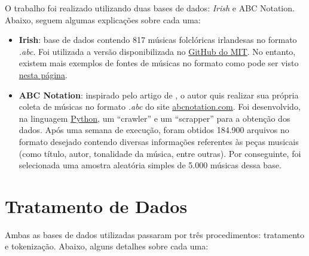 \documentclass{automatextcc}
\begin{document}


O trabalho foi realizado utilizando duas bases de dados: \textit{Irish} e {ABC Notation}. Abaixo, seguem algumas explicações sobre cada uma:

\begin{itemize}
    \item \textbf{Irish}: base de dados contendo 817 músicas folclóricas irlandesas no formato \textit{.abc}. Foi utilizada a versão disponibilizada no \href{https://github.com/aamini/introtodeeplearning/blob/master/mitdeeplearning/data/irish.abc}{GitHub do MIT}. No entanto, existem mais exemplos de fontes de músicas no formato como pode ser visto \href{https://www.norbeck.nu/abc/links.asp}{nesta página}. 
    \item \textbf{ABC Notation}: inspirado pelo artigo de \citet{agarwala2017}, o autor quis realizar sua própria coleta de músicas no formato \textit{.abc} do site \href{https://abcnotation.com/}{abcnotation.com}. Foi desenvolvido, na linguagem \href{https://python.org/}{Python}, um ``crawler'' e um ``scrapper'' para a obtenção dos dados. Após uma semana de execução, foram obtidos 184.900 arquivos no formato desejado contendo diversas informações referentes às peças musicais (como título, autor, tonalidade da música, entre outras). Por conseguinte, foi selecionada uma amostra aleatória simples de 5.000 músicas dessa base.
\end{itemize}




\section{Tratamento de Dados}



Ambas as bases de dados utilizadas passaram por três procedimentos: tratamento e tokenização. Abaixo, alguns detalhes sobre cada uma:
\end{document}
